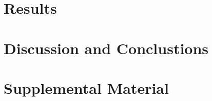 \documentclass[a4paper, 12pt]{article}
\begin{document}
\newpage


\section{Results}



\section{Discussion and Conclustions}


\section{Supplemental Material}

\newpage

{\small
 }
 
\end{document}
